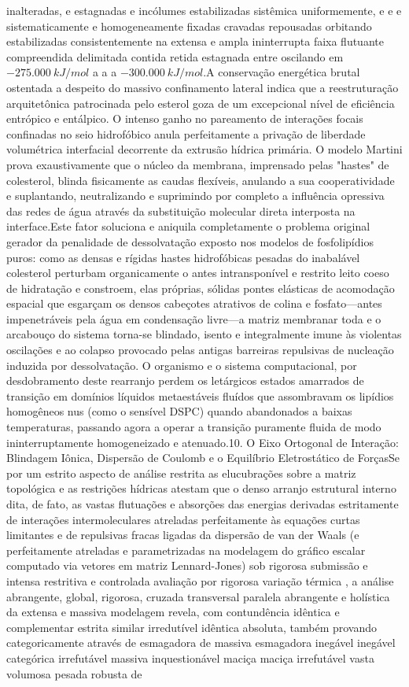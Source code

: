 inalteradas, e estagnadas e incólumes estabilizadas sistêmica uniformemente, e e e sistematicamente e homogeneamente fixadas cravadas repousadas orbitando estabilizadas consistentemente na extensa e ampla ininterrupta faixa flutuante compreendida delimitada contida retida estagnada entre oscilando em $-275.000~kJ/mol$ a a a $-300.000~kJ/mol$.A conservação energética brutal ostentada a despeito do massivo confinamento lateral indica que a reestruturação arquitetônica patrocinada pelo esterol goza de um excepcional nível de eficiência entrópico e entálpico. O intenso ganho no pareamento de interações focais confinadas no seio hidrofóbico anula perfeitamente a privação de liberdade volumétrica interfacial decorrente da extrusão hídrica primária. O modelo Martini prova exaustivamente que o núcleo da membrana, imprensado pelas "hastes" de colesterol, blinda fisicamente as caudas flexíveis, anulando a sua cooperatividade e suplantando, neutralizando e suprimindo por completo a influência opressiva das redes de água através da substituição molecular direta interposta na interface.Este fator soluciona e aniquila completamente o problema original gerador da penalidade de dessolvatação exposto nos modelos de fosfolipídios puros: como as densas e rígidas hastes hidrofóbicas pesadas do inabalável colesterol perturbam organicamente o antes intransponível e restrito leito coeso de hidratação e constroem, elas próprias, sólidas pontes elásticas de acomodação espacial que esgarçam os densos cabeçotes atrativos de colina e fosfato—antes impenetráveis pela água em condensação livre—a matriz membranar toda e o arcabouço do sistema torna-se blindado, isento e integralmente imune às violentas oscilações e ao colapso provocado pelas antigas barreiras repulsivas de nucleação induzida por dessolvatação. O organismo e o sistema computacional, por desdobramento deste rearranjo perdem os letárgicos estados amarrados de transição em domínios líquidos metaestáveis fluídos que assombravam os lipídios homogêneos nus (como o sensível DSPC) quando abandonados a baixas temperaturas, passando agora a operar a transição puramente fluida de modo ininterruptamente homogeneizado e atenuado.10. O Eixo Ortogonal de Interação: Blindagem Iônica, Dispersão de Coulomb e o Equilíbrio Eletrostático de ForçasSe por um estrito aspecto de análise restrita as elucubrações sobre a matriz topológica e as restrições hídricas atestam que o denso arranjo estrutural interno dita, de fato, as vastas flutuações e absorções das energias derivadas estritamente de interações intermoleculares atreladas perfeitamente às equações curtas limitantes e de repulsivas fracas ligadas da dispersão de van der Waals (e perfeitamente atreladas e parametrizadas na modelagem do gráfico escalar computado via vetores em matriz Lennard-Jones) sob rigorosa submissão e intensa restritiva e controlada avaliação por rigorosa variação térmica , a análise abrangente, global, rigorosa, cruzada transversal paralela abrangente e holística da extensa e massiva modelagem revela, com contundência idêntica e complementar estrita similar irredutível idêntica absoluta, também provando categoricamente através de esmagadora de massiva esmagadora inegável inegável categórica irrefutável massiva inquestionável maciça maciça irrefutável vasta volumosa pesada robusta de 